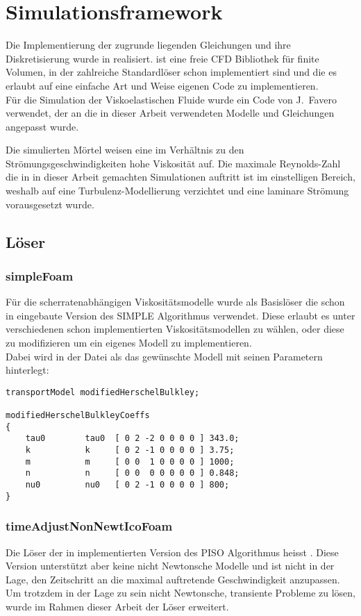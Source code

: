 \section{Simulationsframework}
\label{Kapitel:Implementierung}
Die Implementierung der zugrunde liegenden Gleichungen und ihre Diskretisierung wurde in \openfoam{} \cite{openfoam} realisiert.
\openfoam{} ist eine freie CFD Bibliothek für finite Volumen, in der zahlreiche Standardlöser schon implementiert sind und die es erlaubt auf eine einfache Art und Weise eigenen Code zu implementieren.\\
Für die Simulation der Viskoelastischen Fluide wurde ein Code von J.~Favero \cite{faveroOF} verwendet, der an die in dieser Arbeit verwendeten Modelle und Gleichungen angepasst wurde.

Die simulierten Mörtel weisen eine im Verhältnis zu den Strömungsgeschwindigkeiten hohe Viskosität auf. 
Die maximale Reynolds-Zahl die in in dieser Arbeit gemachten Simulationen auftritt ist im einstelligen Bereich, weshalb auf eine Turbulenz-Modellierung verzichtet und eine laminare Strömung vorausgesetzt wurde.
%
\subsection{Löser}
\subsubsection{simpleFoam}
Für die scherratenabhängigen Viskositätsmodelle wurde als Basislöser die schon in \openfoam{} eingebaute Version  des SIMPLE Algorithmus verwendet.
Diese erlaubt es unter verschiedenen schon implementierten Viskositätsmodellen zu wählen, oder diese zu modifizieren um ein eigenes Modell zu implementieren.\\
Dabei wird in der Datei  als  das gewünschte Modell mit seinen Parametern hinterlegt:
%
\begin{lstlisting}
transportModel modifiedHerschelBulkley;

modifiedHerschelBulkleyCoeffs
{
    tau0        tau0  [ 0 2 -2 0 0 0 0 ] 343.0;
    k           k     [ 0 2 -1 0 0 0 0 ] 3.75;
    m           m     [ 0 0  1 0 0 0 0 ] 1000;
    n           n     [ 0 0  0 0 0 0 0 ] 0.848;
    nu0         nu0   [ 0 2 -1 0 0 0 0 ] 800;
}
\end{lstlisting}
%
\subsubsection{timeAdjustNonNewtIcoFoam}
Die Löser der in \openfoam{} implementierten Version des PISO Algorithmus heisst .
Diese Version unterstützt aber keine nicht Newtonsche Modelle und ist nicht in der Lage, den Zeitschritt an die maximal auftretende Geschwindigkeit anzupassen.\\
Um trotzdem in der Lage zu sein nicht Newtonsche, transiente Probleme zu lösen, wurde im Rahmen dieser Arbeit der Löser  erweitert.

